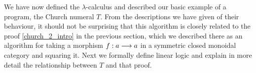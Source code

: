 \documentclass[english,letter paper,12pt,reqno]{article}
\theoremstyle{example}
\newtheorem{question}[theorem]{Question}
\begin{document}

We have now defined the $\lambda$-calculus and described our basic example of a program, the Church numeral $T$. From the descriptions we have given of their behaviour, it should not be surprising that this algorithm is closely related to the proof \eqref{church_2_intro} in the previous section, which we described there as an algorithm for taking a morphism $f: a \longrightarrow a$ in a symmetric closed monoidal category and squaring it. Next we formally define linear logic and explain in more detail the relationship between $T$ and that proof.




\end{document}
